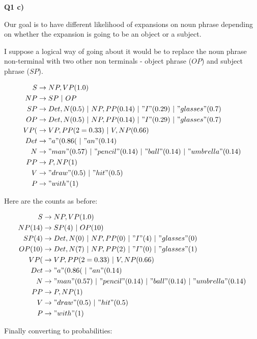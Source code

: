 \documentclass{article}
\newcommand*\OR{\ |\ }
\begin{document}
\textbf{Q1 c)}

	Our goal is to have different likelihood of expansions on noun phrase depending on whether the expansion is going to be an object or a subject.

	I suppose a logical way of going about it would be to replace the noun phrase non-terminal with two other non terminals - object phrase ($OP$) and subject phrase ($SP$). 
	
	\begin{align}
		S &\to NP, VP (1.0)\\
		NP &\to SP \OR  OP\\
		SP &\to Det, N (0.5) \OR NP, PP (0.14)\OR "I" (0.29)\OR "glasses" (0.7)\\
		OP &\to Det, N (0.5) \OR NP, PP (0.14)\OR "I" (0.29)\OR "glasses" (0.7)\\
		VP (&\to VP, PP (2=0.33)\OR V, NP (0.66)\\		
		Det &\to "a" (0.86( \OR "an"(0.14)\\
		N &\to "man" (0.57)\OR "pencil"(0.14) \OR "ball"(0.14) \OR "umbrella"(0.14)\\
		PP &\to P, NP (1)\\
		V &\to "draw" (0.5) \OR "hit"(0.5)\\
		P &\to "with" (1) 
	\end{align}
	
	Here are the counts as before:
	
	\begin{align}
		S &\to NP, VP (1.0)\\
		NP (14)&\to SP (4)\OR  OP (10)\\
		SP (4) &\to Det, N (0) \OR NP, PP (0)\OR "I" (4) \OR "glasses" (0)\\
		OP (10)&\to  Det, N (7) \OR NP, PP (2)\OR "I" (0)\OR "glasses" (1)\\
		VP (&\to VP, PP (2=0.33)\OR V, NP (0.66)\\		
		Det &\to "a" (0.86( \OR "an"(0.14)\\
		N &\to "man" (0.57)\OR "pencil"(0.14) \OR "ball"(0.14) \OR "umbrella"(0.14)\\
		PP &\to P, NP (1)\\
		V &\to "draw" (0.5) \OR "hit"(0.5)\\
		P &\to "with" (1) 
	\end{align}
	
	Finally converting to probabilities:
	
\end{document}
